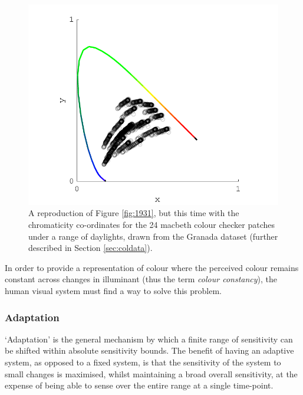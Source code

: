\begin{figure}[htbp]
\includegraphics[max width=\textwidth]{figs/LitRev/ColorimetryDemo6.pdf}
\caption{A reproduction of Figure \ref{fig:1931}, but this time with the chromaticity co-ordinates for the 24 macbeth colour checker patches under a range of daylights, drawn from the Granada dataset \citep{hernandez-andres_color_2001} (further described in Section \ref{sec:coldata}).}
\label{fig:problem}
\end{figure}

In order to provide a representation of colour where the perceived colour remains constant across changes in illuminant (thus the term \emph{colour constancy}), the human visual system must find a way to solve this problem.

\subsubsection{Adaptation}

`Adaptation' is the general mechanism by which a finite range of sensitivity can be shifted within absolute sensitivity bounds. The benefit of having an adaptive system, as opposed to a fixed system, is that the sensitivity of the system to small changes is maximised, whilst maintaining a broad overall sensitivity, at the expense of being able to sense over the entire range at a single time-point. 

